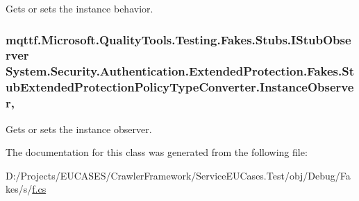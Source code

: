Gets or sets the instance behavior.

\hypertarget{class_system_1_1_security_1_1_authentication_1_1_extended_protection_1_1_fakes_1_1_stub_extendedf67afed15bbc0df07bfc91316f6f81f0_a0a1b5e43fbbec2d5952189454e39c3fb}{
\subsubsection[{Instance\-Observer}]{\setlength{\rightskip}{0pt plus 5cm}mqttf.\-Microsoft.\-Quality\-Tools.\-Testing.\-Fakes.\-Stubs.\-I\-Stub\-Observer System.\-Security.\-Authentication.\-Extended\-Protection.\-Fakes.\-Stub\-Extended\-Protection\-Policy\-Type\-Converter.\-Instance\-Observer\hspace{0.3cm}{\ttfamily [get]}, {\ttfamily [set]}}}\label{class_system_1_1_security_1_1_authentication_1_1_extended_protection_1_1_fakes_1_1_stub_extendedf67afed15bbc0df07bfc91316f6f81f0_a0a1b5e43fbbec2d5952189454e39c3fb}


Gets or sets the instance observer.



The documentation for this class was generated from the following file\-:\begin{DoxyCompactItemize}
\item 
D\-:/\-Projects/\-E\-U\-C\-A\-S\-E\-S/\-Crawler\-Framework/\-Service\-E\-U\-Cases.\-Test/obj/\-Debug/\-Fakes/s/\hyperlink{s_2f_8cs}{f.\-cs}\end{DoxyCompactItemize}
